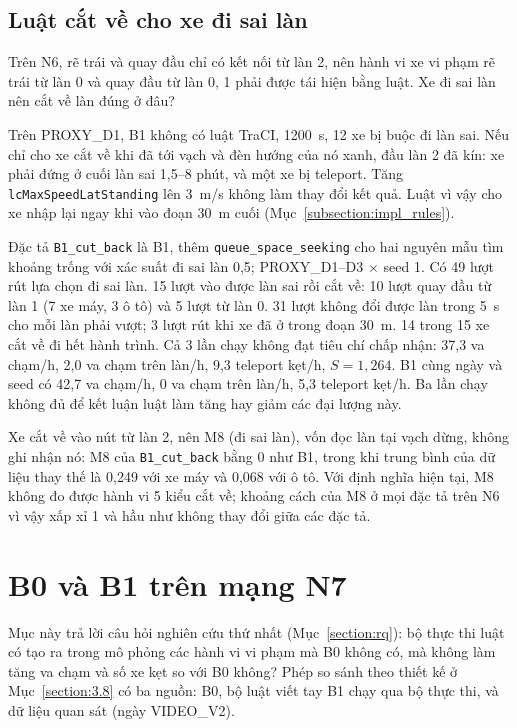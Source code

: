 \documentclass[../main.tex]{subfiles}
\begin{document}
\subsection{Luật cắt về cho xe đi sai làn}
\label{subsection:cutback}

Trên N6, rẽ trái và quay đầu chỉ có kết nối từ làn 2, nên hành vi xe vi phạm rẽ trái từ làn 0 và quay đầu từ làn 0, 1 phải được tái hiện bằng luật. Xe đi sai làn nên cắt về làn đúng ở đâu?

Trên PROXY\_D1, B1 không có luật TraCI, 1200~s, 12 xe bị buộc đi làn sai. Nếu chỉ cho xe cắt về khi đã tới vạch và đèn hướng của nó xanh, đầu làn 2 đã kín: xe phải đứng ở cuối làn sai 1,5--8 phút, và một xe bị teleport. Tăng \texttt{lcMaxSpeedLatStanding} lên 3~m/s không làm thay đổi kết quả. Luật vì vậy cho xe nhập lại ngay khi vào đoạn 30~m cuối (Mục~\ref{subsection:impl_rules}).

Đặc tả \texttt{B1\_cut\_back} là B1, thêm \texttt{queue\_space\_seeking} cho hai nguyên mẫu tìm khoảng trống với xác suất đi sai làn 0,5; PROXY\_D1--D3 $\times$ seed 1. Có 49 lượt rút lựa chọn đi sai làn. 15 lượt vào được làn sai rồi cắt về: 10 lượt quay đầu từ làn 1 (7 xe máy, 3 ô tô) và 5 lượt từ làn 0. 31 lượt không đổi được làn trong 5~s cho mỗi làn phải vượt; 3 lượt rút khi xe đã ở trong đoạn 30~m. 14 trong 15 xe cắt về đi hết hành trình. Cả 3 lần chạy không đạt tiêu chí chấp nhận: 37,3 va chạm/h, 2,0 va chạm trên làn/h, 9,3 teleport kẹt/h, $S = 1{,}264$. B1 cùng ngày và seed có 42,7 va chạm/h, 0 va chạm trên làn/h, 5,3 teleport kẹt/h. Ba lần chạy không đủ để kết luận luật làm tăng hay giảm các đại lượng này.

Xe cắt về vào nút từ làn 2, nên M8 (đi sai làn), vốn đọc làn tại vạch dừng, không ghi nhận nó: M8 của \texttt{B1\_cut\_back} bằng 0 như B1, trong khi trung bình của dữ liệu thay thế là 0,249 với xe máy và 0,068 với ô tô. Với định nghĩa hiện tại, M8 không đo được hành vi 5 kiểu cắt về; khoảng cách của M8 ở mọi đặc tả trên N6 vì vậy xấp xỉ 1 và hầu như không thay đổi giữa các đặc tả.

\section{B0 và B1 trên mạng N7}
\label{section:compare_b0_b1}

Mục này trả lời câu hỏi nghiên cứu thứ nhất (Mục~\ref{section:rq}): bộ thực thi luật có tạo ra trong mô phỏng các hành vi vi phạm mà B0 không có, mà không làm tăng va chạm và số xe kẹt so với B0 không? Phép so sánh theo thiết kế ở Mục~\ref{section:3.8} có ba nguồn: B0, bộ luật viết tay B1 chạy qua bộ thực thi, và dữ liệu quan sát (ngày VIDEO\_V2).
\end{document}

